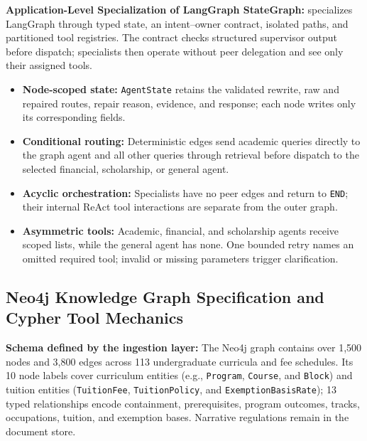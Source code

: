 \textbf{Application-Level Specialization of LangGraph StateGraph:}
\system{} specializes LangGraph through typed state, an intent--owner contract, isolated paths, and partitioned tool registries. The contract checks structured supervisor output before dispatch; specialists then operate without peer delegation and see only their assigned tools.
\begin{itemize}
    \setlength{\itemsep}{1.5pt}
    \setlength{\parsep}{0pt}
    \setlength{\parskip}{0pt}
    \item \textbf{Node-scoped state:} \texttt{AgentState} retains the validated rewrite, raw and repaired routes, repair reason, evidence, and response; each node writes only its corresponding fields.
    
    \item \textbf{Conditional routing:} Deterministic edges send academic queries directly to the graph agent and all other queries through retrieval before dispatch to the selected financial, scholarship, or general agent.
    
    \item \textbf{Acyclic orchestration:} Specialists have no peer edges and return to \texttt{END}; their internal ReAct tool interactions are separate from the outer graph.
    
    \item \textbf{Asymmetric tools:} Academic, financial, and scholarship agents receive scoped lists, while the general agent has none. One bounded retry names an omitted required tool; invalid or missing parameters trigger clarification.
\end{itemize}

\subsection{Neo4j Knowledge Graph Specification and Cypher Tool Mechanics}
\label{sec:neo4j_graph}

\textbf{Schema defined by the ingestion layer:}
The Neo4j graph contains over 1,500 nodes and 3,800 edges across 113 undergraduate curricula and fee schedules. Its 10 node labels cover curriculum entities (e.g., \texttt{Program}, \texttt{Course}, and \texttt{Block}) and tuition entities (\texttt{TuitionFee}, \texttt{TuitionPolicy}, and \texttt{ExemptionBasisRate}); 13 typed relationships encode containment, prerequisites, program outcomes, tracks, occupations, tuition, and exemption bases. Narrative regulations remain in the document store.

